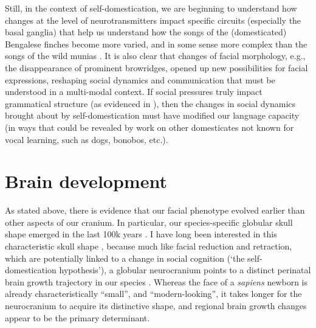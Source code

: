 Still, in the context of self-domestication, we are beginning to understand how changes at the level of neurotransmitters impact specific circuits (especially the basal ganglia) that help us understand how the songs of the (domesticated) Bengalese finches become more varied, and in some sense more complex than the songs of the wild munias \citep{tomtics}. It is also clear that changes of facial morphology, e.g., the disappearance of prominent browridges, opened up new possibilities for facial expressions, reshaping social dynamics \citep{godinho2018supraorbital} and communication that must be understood in a multi-modal context. If social pressures truly impact grammatical structure (as evidenced in \cite{raviv2020language}), then the changes in social dynamics brought about by self-domestication must have modified our language capacity (in ways that could be revealed by work on other domesticates not known for vocal learning, such as dogs, bonobos, etc.).

\section{Brain development}

As stated above, there is evidence that our facial phenotype evolved earlier than other aspects of our cranium. In particular, our species-specific globular skull shape emerged in the last 100k years \citep{neubauer2018evolution}. I have long been interested in this characteristic skull shape \citep{boeckx2013biolinguistics,boeckx2014shape}, because much like facial reduction and retraction, which are potentially linked to a change in social cognition (`the self-domestication hypothesis'), a globular neurocranium points to a distinct perinatal brain growth trajectory in our species \citep{gunz2010brain}. Whereas the face of a \textit{sapiens} newborn is already characteristically ``small'', and ``modern-looking'', it takes longer for the neurocranium to acquire its distinctive shape, and regional brain growth changes appear to be the primary determinant.


